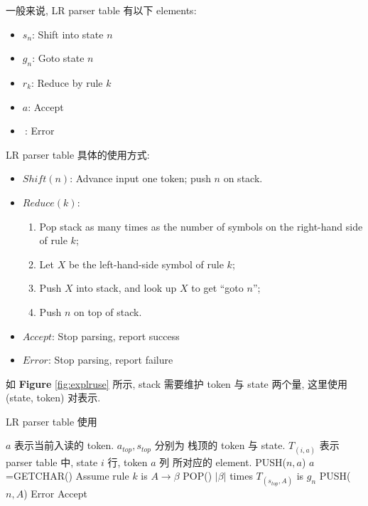一般来说, LR parser table 有以下 elements:
\begin{itemize}
    \item $s_n$: Shift into state $n$
    \item $g_n$: Goto state $n$
    \item $r_k$: Reduce by rule $k$
    \item $a$: Accept
    \item $\ $: Error 
\end{itemize}

LR parser table 具体的使用方式:
\begin{itemize}
    \item $Shift(n)$: Advance input one token; push $n$ on stack.
    \item $Reduce(k)$:
    \begin{enumerate}
        \item Pop stack as many times as the number of symbols on the right-hand side of rule $k$;
        \item Let $X$ be the left-hand-side symbol of rule $k$;
        \item Push $X$ into stack, and look up $X$ to get ``goto $n$''; 
        \item Push $n$ on top of stack.
    \end{enumerate}
    \item $Accept$: Stop parsing, report success
    \item $Error$: Stop parsing, report failure
\end{itemize}

如 \textbf{Figure} \ref{fig:explruse} 所示, stack 需要维护 token 与 state 两个量, 这里使用 (state, token) 对表示. 

\begin{algorithm}[H]
    \caption{LR parser table 使用}
    \begin{algorithmic}
        \State $a$ 表示当前入读的 token. 
        \State $a_{top}, s_{top}$ 分别为 栈顶的 token 与 state.
        \State $T_{(i,a)}$ 表示 parser table 中, state $i$ 行, token $a$ 列 所对应的 element. 
        \Repeat
                \State PUSH($n, a$)
                \State $a$=GETCHAR()
                \State Assume  rule $k$ is $A\to \beta$
                \State POP() $|\beta|$ times
                \State $T_{(s_{top}, A)}$ is $g_n$
                \State PUSH($n, A$)
            \Else
                \State Error
            \EndIf
        \State Accept
    \end{algorithmic}
\end{algorithm}

